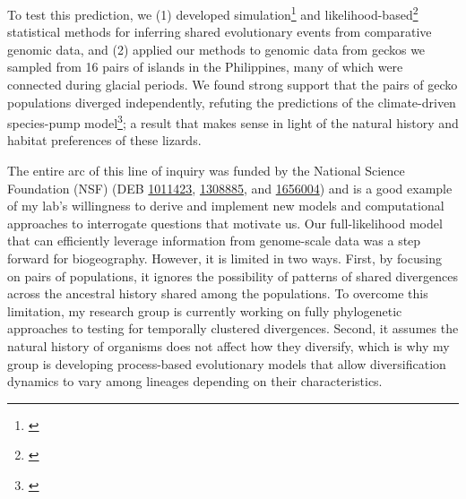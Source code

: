 To test this prediction, we
(1) developed
simulation\footnote{\label{Oaks14dpp}\hspace{-0.8em}}
and
likelihood-based\footnote{\label{Oaks18ecoevolity}\hspace{-0.8em}}
statistical methods for inferring shared evolutionary events from comparative
genomic data, and
(2) applied our methods to genomic data from geckos we sampled from 16 pairs of
islands in the Philippines, many of which were connected during glacial
periods.
We found strong support that the pairs of gecko populations diverged
independently,
refuting the predictions of the climate-driven species-pump
model\footnote{\label{Oaks18paic}\hspace{-0.8em}};
a result that makes sense in light of the natural history and habitat
preferences of these lizards.

The entire arc of this line of inquiry was funded by the National Science
Foundation (NSF)
(DEB
\href{https://www.nsf.gov/awardsearch/showAward?AWD_ID=1011423}{1011423},
\href{https://www.nsf.gov/awardsearch/showAward?AWD_ID=1308885}{1308885},
and
\href{https://www.nsf.gov/awardsearch/showAward?AWD_ID=1656004}{1656004})
and is a good example of my lab's willingness to derive and implement new
models and computational approaches to interrogate questions that motivate us.
Our full-likelihood model that can efficiently leverage information
from genome-scale data was a step forward for biogeography.
However,
it is limited in two ways.
First,
by focusing on pairs of populations, it ignores the possibility of patterns of
shared divergences across the ancestral history shared among the populations.
To overcome this limitation, my research group is currently working on fully
phylogenetic approaches to testing for temporally clustered divergences.
Second, it assumes the natural history of organisms does not affect how they
diversify, which is why my group is developing process-based evolutionary
models that allow diversification dynamics to vary among lineages depending on
their characteristics.

